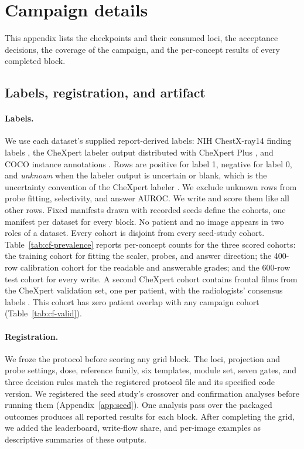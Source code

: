 \section{Campaign details}
\label{app:campaign}

This appendix lists the checkpoints and their consumed loci, the acceptance decisions, the coverage of the campaign, and the per-concept results of every completed block.

\subsection{Labels, registration, and artifact}
\label{app:cf-labels}

\paragraph{Labels.} We use each dataset's supplied report-derived labels: NIH ChestX-ray14 finding labels \citep{wang2017chestxray}, the CheXpert labeler output \citep{irvin2019chexpert} distributed with CheXpert Plus \citep{chambon2024chexpertplus}, and COCO instance annotations \citep{lin2014coco}. Rows are positive for label 1, negative for label 0, and \emph{unknown} when the labeler output is uncertain or blank, which is the uncertainty convention of the CheXpert labeler \citep{irvin2019chexpert}. We exclude unknown rows from probe fitting, selectivity, and answer AUROC. We write and score them like all other rows. Fixed manifests drawn with recorded seeds define the cohorts, one manifest per dataset for every block. No patient and no image appears in two roles of a dataset. Every cohort is disjoint from every seed-study cohort. Table~\ref{tab:cf-prevalence} reports per-concept counts for the three scored cohorts: the training cohort for fitting the scaler, probes, and answer direction; the 400-row calibration cohort for the readable and answerable grades; and the 600-row test cohort for every write. A second CheXpert cohort contains \cfValidRows{} frontal films from the CheXpert validation set, one per patient, with the radiologists' consensus labels \citep{irvin2019chexpert}. This cohort has zero patient overlap with any campaign cohort (Table~\ref{tab:cf-valid}).

\paragraph{Registration.} We froze the protocol before scoring any grid block. The loci, projection and probe settings, dose, reference family, six templates, module set, seven gates, and three decision rules match the registered protocol file and its specified code version. We registered the seed study's crossover and confirmation analyses before running them (Appendix~\ref{app:seed}). One analysis pass over the packaged outcomes produces all reported results for each block. After completing the grid, we added the leaderboard, write-flow share, and per-image examples as descriptive summaries of these outputs.

